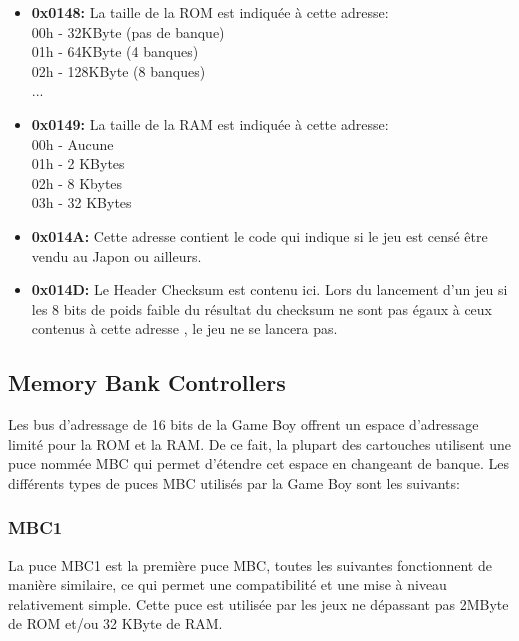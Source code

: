 \documentclass{report}
\begin{document}
\begin{itemize}
\item \textbf{0x0148:} La taille de la ROM est indiquée à cette adresse:
\\00h -  32KByte (pas de banque)
\\01h -  64KByte (4 banques)
\\02h - 128KByte (8 banques)
\\...

\item \textbf{0x0149:} La taille de la RAM est indiquée à cette adresse:
\\00h - Aucune
\\01h - 2 KBytes
\\02h - 8 Kbytes
\\03h - 32 KBytes\\

\item \textbf{0x014A:} Cette adresse contient le code qui indique si le jeu est censé être vendu au Japon ou ailleurs.\\

\item \textbf{0x014D:} Le Header Checksum est contenu ici. Lors du lancement d'un jeu si les 8 bits de poids faible du résultat du checksum ne sont pas égaux à ceux contenus à cette adresse , le jeu ne se lancera pas.\\

\end{itemize}

\subsection{Memory Bank Controllers}
Les bus d'adressage de 16 bits de la Game Boy offrent un espace d'adressage limité pour la ROM et la RAM. De ce fait, la plupart des cartouches utilisent une puce nommée MBC qui permet d'étendre cet espace en changeant de banque. Les différents types de puces MBC utilisés par la Game Boy sont les suivants:\\

\subsubsection{MBC1}
	La puce MBC1 est la première puce MBC, toutes les suivantes fonctionnent de manière similaire, ce qui permet une compatibilité et une mise à niveau relativement simple. Cette puce est utilisée par les jeux ne dépassant pas 2MByte de ROM et/ou 32 KByte de RAM.
\end{document}
